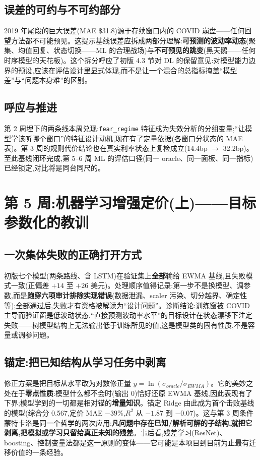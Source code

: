 \documentclass[11pt]{ctexart}
\begin{document}
\subsection{误差的可约与不可约部分}
2019 年尾段的巨大误差(MAE \$31.8)源于存续窗口内的 COVID 崩盘——任何回望方法都不可能预见。这提示基线误差应拆成两部分理解:\textbf{可预测的波动率动态}(聚集、均值回复、状态切换——ML 的合理战场)与\textbf{不可预见的跳变}(黑天鹅——任何时序模型的天花板)。这个拆分呼应了初版 4.3 节对 DL 的保留意见:对模型能力边界的预设,应该在评估设计里显式体现,而不是让一个混合的总指标掩盖``模型差''与``问题本身难''的区别。

\subsection{呼应与推进}
第 2 周埋下的两条线本周兑现:\texttt{fear\_regime} 特征成为失效分析的分组变量;``让模型学该听哪个窗口''的特征设计动机,现在有了定量依据(各窗口分状态的 MAE 表)。第 3 周的规则代价结论也在真实利率状态上复检成立(14.4bp $\to$ 32.2bp)。至此基线闭环完成,第 5--6 周 ML 的评估口径(同一 oracle、同一面板、同一指标)已经锁定,对比将是同台同尺的。

\section{第 5 周:机器学习增强定价(上)——目标参数化的教训}

\subsection{一次集体失败的正确打开方式}
初版七个模型(两条路线、含 LSTM)在验证集上\textbf{全部}输给 EWMA 基线,且失败模式一致(正偏差 $+14$ 至 $+26$ 美元)。处理顺序值得记录:第一步不是换模型、调参数,而是\textbf{跑穿六项审计排除实现错误}(数据泄漏、scaler 污染、切分越界、确定性等);全部通过后,失败才有资格被解读为``设计问题''。诊断结论:训练窗被 COVID 主导而验证窗是低波动状态,``直接预测波动率水平''的目标设计在状态漂移下注定失败——树模型结构上无法输出低于训练所见的值,这是模型类的固有性质,不是容量或调参问题。

\subsection{锚定:把已知结构从学习任务中剥离}
修正方案是把目标从水平改为对数修正量 $y=\ln(\sigma_{oracle}/\sigma_{EWMA})$。它的美妙之处在于\textbf{零点性质}:模型什么都不会时(输出 0)恰好还原 EWMA 基线,因此表现有了下界;模型学到的一切都是相对锚的\textbf{增量知识}。锚定 Ridge 由此成为首个击败基线的模型(综合分 0.567,定价 MAE $-39\%$,$R^2$ 从 $-1.87$ 到 $-0.07$)。这与第 3 周条件蒙特卡洛是同一个哲学的两次应用:\textbf{凡问题中存在已知/解析可解的子结构,就把它剥离,把模拟或学习只留给真正未知的残差}。事后看,残差学习(ResNet)、boosting、控制变量法都是这一原则的变体——它可能是本项目到目前为止最有迁移价值的一条经验。
\end{document}
